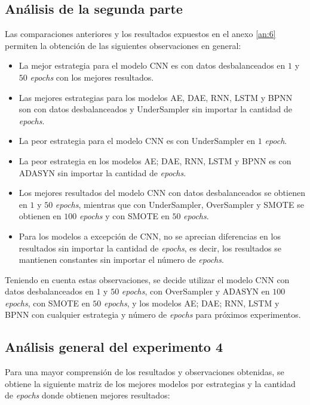 \subsection{An\'{a}lisis de la segunda parte}
  Las comparaciones anteriores y los resultados expuestos en el anexo \ref{an:6} permiten la obtenci\'{o}n de las siguientes observaciones en general:
  
  \begin{itemize}
  	\item La mejor estrategia para el modelo CNN es con datos desbalanceados en $1$ y $50$ \textit{epochs} con los mejores resultados.
  	\item Las mejores estrategias para los modelos AE, DAE, RNN, LSTM y BPNN son con datos desbalanceados y UnderSampler sin importar la cantidad de \textit{epochs}.
  	\item La peor estrategia para el modelo CNN es con UnderSampler en $1$ \textit{epoch}.
  	\item La peor estrategia en los modelos AE; DAE, RNN, LSTM y BPNN es con ADASYN sin importar la cantidad de \textit{epochs}.
  	\item Los mejores resultados del modelo CNN con datos desbalanceados se obtienen en $1$ y $50$ \textit{epochs}, mientras que con UnderSampler, OverSampler y SMOTE se obtienen en $100$ \textit{epochs} y con SMOTE en $50$ \textit{epochs}.
  	\item Para los modelos a excepci\'{o}n de CNN, no se aprecian diferencias en los resultados sin importar la cantidad de \textit{epochs}, es decir, los resultados se mantienen constantes sin importar el n\'{u}mero de \textit{epochs}.
  \end{itemize}

  Teniendo en cuenta estas observaciones, se decide utilizar el modelo CNN con datos desbalanceados en $1$ y $50$ \textit{epochs}, con OverSampler y ADASYN en $100$ \textit{epochs}, con SMOTE en $50$ \textit{epochs}, y los modelos AE; DAE; RNN, LSTM y BPNN con cualquier estrategia y n\'{u}mero de \textit{epochs} para pr\'{o}ximos experimentos.

\subsection{An\'{a}lisis general del experimento 4}
  Para una mayor comprensi\'{o}n de los resultados y observaciones obtenidas, se obtiene la siguiente matriz de los mejores modelos por estrategias y la cantidad de \textit{epochs} donde obtienen mejores resultados:
  
